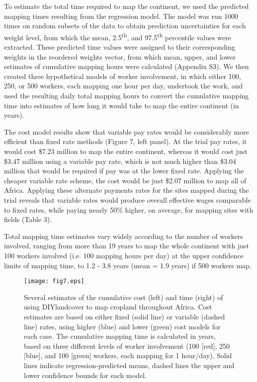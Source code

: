 \documentclass[preprint,12pt,authoryear]{elsarticle}
\begin{document}
To estimate the total time required to map the continent, we used the predicted mapping times resulting from the regression model. The model was run 1000 times on random subsets of the data to obtain prediction uncertainties for each weight level, from which the mean, 2.5\textsuperscript{th}, and 97.5\textsuperscript{th} percentile values were extracted. These predicted time values were assigned to their corresponding weights in the reordered weights vector, from which mean, upper, and lower estimates of cumulative mapping hours were calculated (Appendix S3). We then created three hypothetical models of worker involvement, in which either 100, 250, or 500 workers, each mapping one hour per day, undertook the work, and used the resulting daily total mapping hours to convert the cumulative mapping time into estimates of how long it would take to map the entire continent (in years). 

The cost model results show that variable pay rates would be considerably more efficient than fixed rate methods (Figure 7, left panel). At the trial pay rates, it would cost \$7.23 million to map the entire continent, whereas it would cost just \$3.47 million using a variable pay rate, which is not much higher than \$3.04 million that would be required if pay was at the lower fixed rate. Applying the cheaper variable rate scheme, the cost would be just \$2.07 million to map all of Africa. Applying these alternate payments rates for the sites mapped during the trial reveals that variable rates would produce overall effective wages comparable to fixed rates, while paying nearly 50\% higher, on average, for mapping sites with fields (Table 3).  

Total mapping time estimates vary widely according to the number of workers involved, ranging from more than 19 years to map the whole continent with just 100 workers involved (i.e. 100 mapping hours per day) at the upper confidence limits of mapping time, to 1.2 - 3.8 years (mean = 1.9 years) if 500 workers map.  

\begin{figure}[!ht]
  \begin{center}
    \texttt{[image: fig7.eps]}
    \vspace{-1cm}
    \caption{Several estimates of the cumulative cost (left) and time (right) of using DIYlandcover to map cropland throughout Africa. Cost estimates are based on either fixed (solid line) or variable (dashed line) rates, using higher (blue) and lower (green) cost models for each case. The cumulative mapping time is calculated in years, based on three different levels of worker involvement (100 [red], 250 [blue], and 100 [green] workers, each mapping for 1 hour/day). Solid lines indicate regression-predicted means, dashed lines the upper and lower confidence bounds for each model. } 
    \label{default}
  \end{center}
\end{figure}
\end{document}

